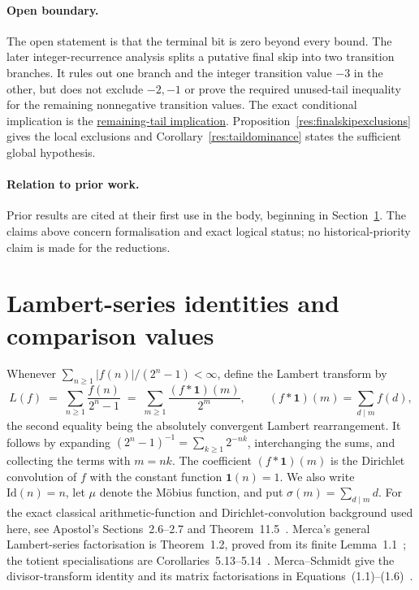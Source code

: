 \documentclass[11pt]{article}
\newcommand{\commit}{bb4e24651b37cd096d3749ef299c3317930b3a3b}
\newcommand{\repobase}{https://github.com/wcook04/plectis-lean-erdos249-257/blob/\commit}
\newcommand{\PK}{Erdos249257}
\newcommand{\lword}[4]{\href{\repobase/\PK/#1\#L#2}{#4}}
\theoremstyle{definition}
\theoremstyle{remark}
\begin{document}
\paragraph{Open boundary.}
The open statement is that the terminal bit is zero beyond every bound.  The
later integer-recurrence analysis splits a putative final skip into two
transition branches.  It rules out one branch and the integer transition value
\(-3\) in the other, but does not exclude \(-2,-1\) or prove the required
unused-tail inequality for the remaining nonnegative transition values.  The exact
conditional implication is the
\lword{HalfCylinderLastProducerContradiction.lean}{436}{half_mem_mersenneAchievementSet_of_middleProducerTailEscapeExceptNegThree}{remaining-tail implication}.
Proposition~\ref{res:finalskipexclusions} gives the local exclusions and
Corollary~\ref{res:taildominance} states the sufficient global hypothesis.

\paragraph{Relation to prior work.}
Prior results are cited at their first use in the body, beginning in
Section~\ref{sec:ladder}.  The claims above concern formalisation and exact
logical status; no historical-priority claim is made for the reductions.

\section{Lambert-series identities and comparison values}\label{sec:ladder}

Whenever \(\sum_{n\ge1}|f(n)|/(2^n-1)<\infty\), define the Lambert transform by
\[
L(f)\;=\;\sum_{n\ge1}\frac{f(n)}{2^n-1}\;=\;\sum_{m\ge1}\frac{(f*\mathbf 1)(m)}{2^m},
\qquad (f*\mathbf 1)(m)=\sum_{d\mid m} f(d),
\]
the second equality being the absolutely convergent Lambert rearrangement.
It follows by expanding \((2^n-1)^{-1}=\sum_{k\geq1}2^{-nk}\), interchanging
the sums, and collecting the terms with \(m=nk\).  The coefficient
\((f*\mathbf 1)(m)\) is the Dirichlet convolution of \(f\) with the constant
function \(\mathbf 1(n)=1\).  We also write \(\mathrm{Id}(n)=n\), let \(\mu\)
denote the M\"obius function, and put \(\sigma(m)=\sum_{d\mid m}d\).
For the exact classical arithmetic-function and Dirichlet-convolution
background used here, see Apostol's Sections~2.6--2.7 and
Theorem~11.5~\cite[pp.~28--32, 228--229]{apostol}.  Merca's general
Lambert-series factorisation is Theorem~1.2, proved from its finite
Lemma~1.1~\cite[pp.~420--421]{merca2017}; the totient specialisations are
Corollaries~5.13--5.14~\cite[pp.~430--431]{merca2017}.
Merca--Schmidt give the divisor-transform identity and its matrix
factorisations in Equations~(1.1)--(1.6)~\cite[pp.~31--34]{mercaschmidt}.
\end{document}

